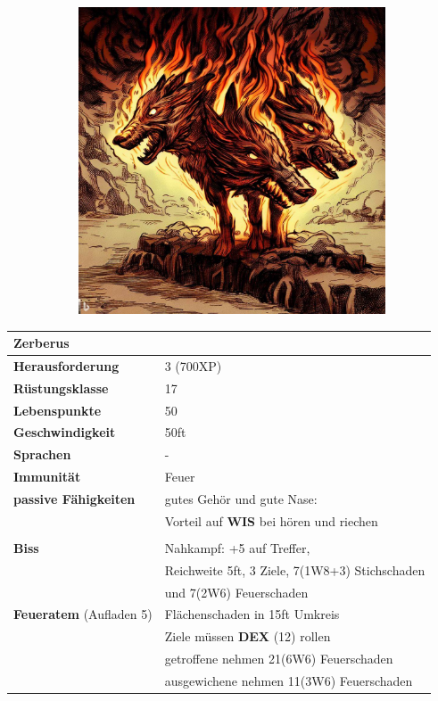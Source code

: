 \documentclass[11pt, twoside]{article}
\begin{document}
\begin{figure}[H]
\begin{subfigure}{0.3\textwidth}
  \end{subfigure}%
  \begin{subfigure}{0.3\textwidth}
    \centering
    \includegraphics[width=0.99\linewidth]{dogo3.jpeg}
  \end{subfigure}
\end{figure}

\begin{center}
\begin{tabular}{ll}
\textbf{Zerberus} & \label{table:zerberusstats}\\[0pt]
\hline
\textbf{Herausforderung} & 3 (700XP)\\[0pt]
\textbf{Rüstungsklasse} & 17\\[0pt]
\textbf{Lebenspunkte} & 50\\[0pt]
\textbf{Geschwindigkeit} & 50ft\\[0pt]
\textbf{Sprachen} & -\\[0pt]
\textbf{Immunität} & Feuer\\[0pt]
\textbf{passive Fähigkeiten} & gutes Gehör und gute Nase:\\[0pt]
 & Vorteil auf \textbf{WIS} bei hören und riechen\\[0pt]
 & \\[0pt]
\textbf{Biss} & Nahkampf: +5 auf Treffer,\\[0pt]
 & Reichweite 5ft, 3 Ziele, 7(1W8+3) Stichschaden\\[0pt]
 & und 7(2W6) Feuerschaden\\[0pt]
\textbf{Feueratem} (Aufladen 5) & Flächenschaden in 15ft Umkreis\\[0pt]
 & Ziele müssen \textbf{DEX} (12) rollen\\[0pt]
 & getroffene nehmen 21(6W6) Feuerschaden\\[0pt]
 & ausgewichene nehmen 11(3W6) Feuerschaden\\[0pt]
\end{tabular}
\end{center}
\end{document}
